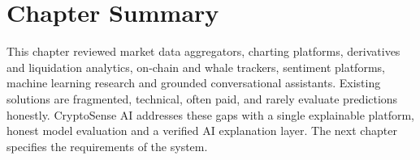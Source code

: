 \section{Chapter Summary}
This chapter reviewed market data aggregators, charting platforms, derivatives and liquidation analytics, on-chain and whale trackers, sentiment platforms, machine learning research and grounded conversational assistants. Existing solutions are fragmented, technical, often paid, and rarely evaluate predictions honestly. CryptoSense AI addresses these gaps with a single explainable platform, honest model evaluation and a verified AI explanation layer. The next chapter specifies the requirements of the system.
